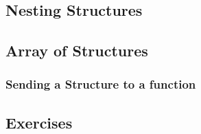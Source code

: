 \subsection{Nesting Structures}
\subsection{Array of Structures}
\subsubsection{Sending a Structure to a function}

\subsection{Exercises}
